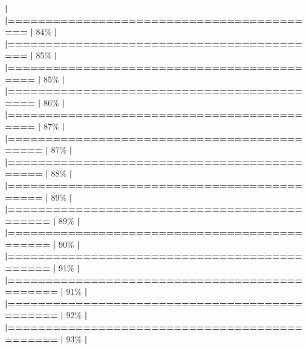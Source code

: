 \documentclass[
]{book}
\newenvironment{Shaded}{\begin{snugshade}}{\end{snugshade}}
\newcommand{\DecValTok}[1]{\textcolor[rgb]{0.00,0.00,0.81}{#1}}
\newcommand{\ErrorTok}[1]{\textcolor[rgb]{0.64,0.00,0.00}{\textbf{#1}}}
\newcommand{\NormalTok}[1]{#1}
\newcommand{\SpecialCharTok}[1]{\textcolor[rgb]{0.81,0.36,0.00}{\textbf{#1}}}
\begin{document}
\begin{Shaded}
\begin{Highlighting}[]
  \SpecialCharTok{|}                                                        
  \ErrorTok{|==========================================}        \ErrorTok{|}  \DecValTok{84}\NormalTok{\%}
  \SpecialCharTok{|}                                                        
  \ErrorTok{|==========================================}        \ErrorTok{|}  \DecValTok{85}\NormalTok{\%}
  \SpecialCharTok{|}                                                        
  \ErrorTok{|===========================================}       \ErrorTok{|}  \DecValTok{85}\NormalTok{\%}
  \SpecialCharTok{|}                                                        
  \ErrorTok{|===========================================}       \ErrorTok{|}  \DecValTok{86}\NormalTok{\%}
  \SpecialCharTok{|}                                                        
  \ErrorTok{|===========================================}       \ErrorTok{|}  \DecValTok{87}\NormalTok{\%}
  \SpecialCharTok{|}                                                        
  \ErrorTok{|============================================}      \ErrorTok{|}  \DecValTok{87}\NormalTok{\%}
  \SpecialCharTok{|}                                                        
  \ErrorTok{|============================================}      \ErrorTok{|}  \DecValTok{88}\NormalTok{\%}
  \SpecialCharTok{|}                                                        
  \ErrorTok{|============================================}      \ErrorTok{|}  \DecValTok{89}\NormalTok{\%}
  \SpecialCharTok{|}                                                        
  \ErrorTok{|=============================================}     \ErrorTok{|}  \DecValTok{89}\NormalTok{\%}
  \SpecialCharTok{|}                                                        
  \ErrorTok{|=============================================}     \ErrorTok{|}  \DecValTok{90}\NormalTok{\%}
  \SpecialCharTok{|}                                                        
  \ErrorTok{|=============================================}     \ErrorTok{|}  \DecValTok{91}\NormalTok{\%}
  \SpecialCharTok{|}                                                        
  \ErrorTok{|==============================================}    \ErrorTok{|}  \DecValTok{91}\NormalTok{\%}
  \SpecialCharTok{|}                                                        
  \ErrorTok{|==============================================}    \ErrorTok{|}  \DecValTok{92}\NormalTok{\%}
  \SpecialCharTok{|}                                                        
  \ErrorTok{|==============================================}    \ErrorTok{|}  \DecValTok{93}\NormalTok{\%}
  \SpecialCharTok{|}                                                        

\end{Highlighting}
\end{Shaded}
\end{document}
